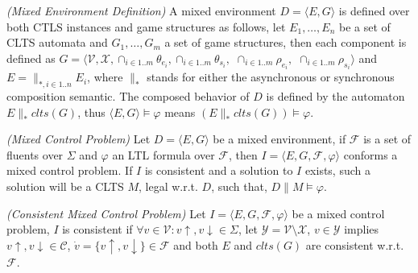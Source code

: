 
\begin{definition}
	\label{def:mixed_env} \emph{(Mixed Environment Definition)} 
	A mixed environment $D = \langle E, G \rangle$ is defined over both CTLS instances and game structures as follows,
	let $E_1,\ldots,E_n$ be a set of CLTS automata and $G_1,\ldots,G_m$ a set of game structures,
	then each component is defined as $G=\langle \mathcal{V}, \mathcal{X}, \cap_{i \in 1..m}\theta_{e_i}, \cap_{i \in 1..m}\theta_{s_i},$ $\cap_{i \in 1..m}\rho_{e_i},$ $\cap_{i \in 1..m}\rho_{s_i}\rangle$ and $E = \parallel_{*,i \in 1..n} E_i$, where $\parallel_*$ stands for either the asynchronous or synchronous composition semantic.
	The composed behavior of $D$ is defined by the automaton $E \parallel_* clts(G)$, thus $\langle E, G \rangle \models \varphi$ means $(E \parallel_* clts(G)) \models \varphi$.
\end{definition}


\begin{definition}
	\label{def:mixed_control_problem} \emph{(Mixed Control Problem)} 
	Let $D= \langle E, G \rangle$ be a mixed environment, if $\mathcal{F}$ is a set of fluents over $\Sigma$ and $\varphi$ an LTL formula over $\mathcal{F}$, then $I = \langle E, G, \mathcal{F}, \varphi \rangle$ conforms a mixed control problem. If $I$ is consistent and a solution to $I$ exists, such a solution will be a CLTS $M$, legal w.r.t. $D$, such that, $D \parallel M \models \varphi$.
\end{definition}

\begin{definition}
	\label{def:consistent_mixed_control_problem} \emph{(Consistent Mixed Control Problem)} 
	Let $I = \langle E, G, \mathcal{F}, \varphi \rangle$ be a mixed control problem, $I$ is consistent if $\forall v \in \mathcal{V}: v\uparrow, v\downarrow \in \Sigma$, let
	$\mathcal{Y} = \mathcal{V}\setminus \mathcal{X}$, $v \in \mathcal{Y}$ implies $v\uparrow, v\downarrow \in \mathcal{C}$, $\dot{v} = \lbrace v\uparrow, v\downarrow \rbrace \in \mathcal{F}$ and both $E$ and $clts(G)$ are consistent w.r.t. $\mathcal{F}$.
\end{definition}